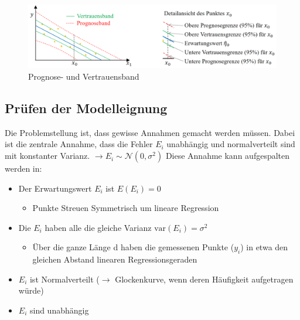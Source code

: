 \begin{figure}[!h]
	\centering
	\includegraphics[width=0.7\linewidth]{figures/ProgrnoseUndVertrauensband}
	\caption{Prognose- und Vertrauensband}
	\label{fig:ProgrnoseUndVertrauen}
\end{figure}

\subsection{Prüfen der Modelleignung}
\label{subsec:PruefenModelleignung}
Die Problemstellung ist, dass gewisse Annahmen gemacht werden müssen. Dabei ist die zentrale Annahme, dass die Fehler $E_i$ unabhängig und normalverteilt sind mit konstanter Varianz. $\rightarrow E_i \sim \mathcal{N}\left(0,\sigma^2\right)$  Diese Annahme kann aufgespalten werden in:
\begin{itemize}
	\item Der Erwartungswert $E_i$ ist $E(E_i)=0$
	\begin{itemize}
		\item Punkte Streuen Symmetrisch um lineare Regression
	\end{itemize}
	\item Die $E_i$ haben alle die gleiche Varianz $\text{var}(E_i)=\sigma^2$
	\begin{itemize}
		\item Über die ganze Länge d haben die gemessenen Punkte ($y_i$) in etwa den gleichen Abstand linearen Regressionsgeraden
	\end{itemize}
	\item $E_i$ ist Normalverteilt ($\rightarrow$ Glockenkurve, wenn deren Häufigkeit aufgetragen würde)
	\item $E_i$ sind unabhängig
\end{itemize}

